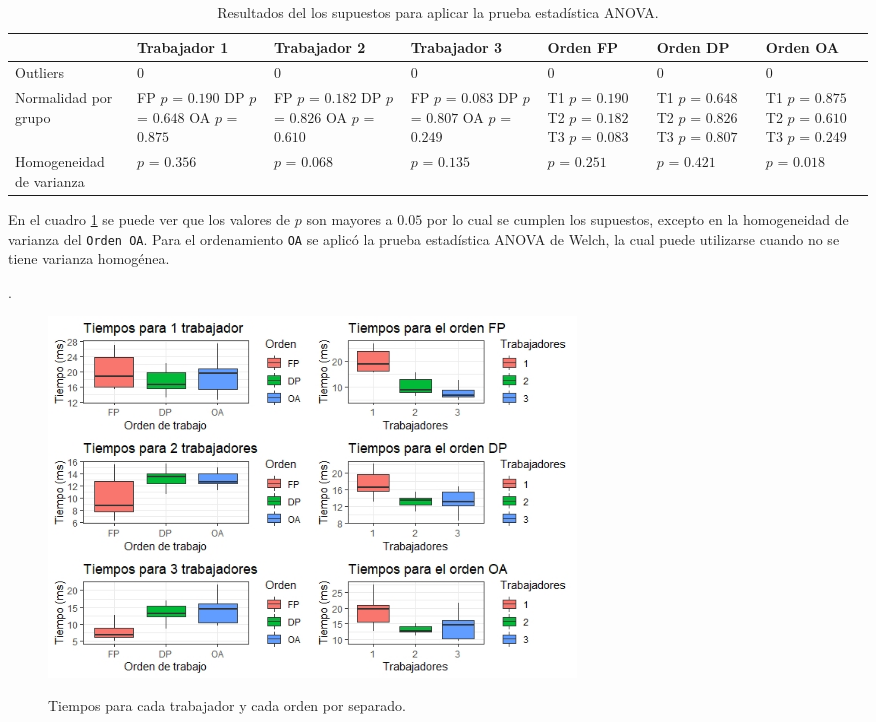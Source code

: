 \documentclass{article}
\begin{document}
\begin{table}[ht]
\centering
\caption{Resultados del los supuestos para aplicar la prueba estadística ANOVA.}
\smallskip

\begin{tabular}{ |p{2.1cm}||p{2.1cm}||p{2.1cm}||p{2.1cm}||p{2.1cm}||p{2cm}||p{2cm}|}
 \hline
 & Trabajador 1 & Trabajador 2 & Trabajador 3 & Orden FP & Orden DP & Orden OA\\
 \hline
 Outliers & $0$ & $0$ & $0$ & $0$ & $0$ & $0$ \\
 \hline
 Normalidad por grupo & FP $p$ = $0.190$ DP $p$ = $0.648$ OA $p$ = $0.875$ & FP $p$ = $0.182$ DP $p$ = $0.826$ OA $p$ = $0.610$ & FP $p$ = $0.083$ DP $p$ = $0.807$ OA $p$ = $0.249$ & T1 $p$ = $0.190$ T2 $p$ = $0.182$ T3 $p$ = $0.083$ &  T1 $p$ = $0.648$ T2 $p$ = $0.826$ T3 $p$ = $0.807$ &  T1 $p$ = $0.875$ T2 $p$ = $0.610$ T3 $p$ = $0.249$ \\
 \hline
 Homogeneidad de varianza & $p$ = $0.356$ & $p$ = $0.068$ & $p$ = $0.135$ & $p$ = $0.251$ & $p$ = $0.421$ & $p$ = $0.018$\\
 \hline
\end{tabular}
\label{Cuadro 3}
\end{table}

En el cuadro \ref{Cuadro 3} se puede ver que los valores de $p$ son mayores a $0.05$ por lo cual se cumplen los supuestos, excepto en la homogeneidad de varianza del \texttt{Orden OA}. Para el ordenamiento \texttt{OA} se aplicó la prueba estadística ANOVA de Welch, la cual puede utilizarse cuando no se tiene varianza homogénea.

\newpage
.
\bigskip

\begin{figure} [h!]%
    \caption{Tiempos para cada trabajador y cada orden por separado.}
    \smallskip
    \centering
    \includegraphics[width=140mm]{Figura2.jpeg} %
    \label{Figura 2}
\end{figure} 
\end{document}
